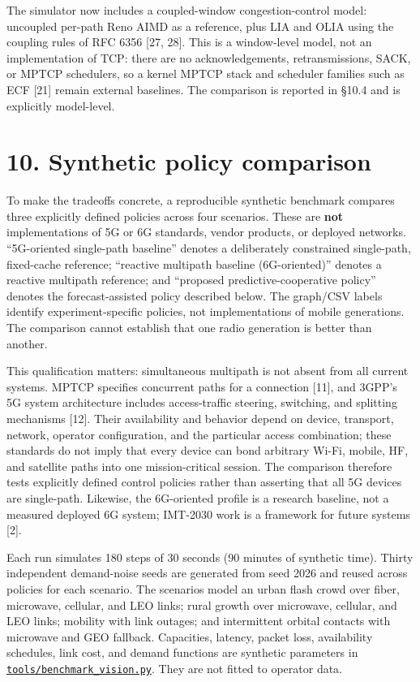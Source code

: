 \documentclass[
  american,
  11pt,
]{article}
\begin{document}
The simulator now includes a coupled-window congestion-control model:
uncoupled per-path Reno AIMD as a reference, plus LIA and OLIA using the
coupling rules of RFC 6356 {[}27, 28{]}. This is a window-level model,
not an implementation of TCP: there are no acknowledgements,
retransmissions, SACK, or MPTCP schedulers, so a kernel MPTCP stack and
scheduler families such as ECF {[}21{]} remain external baselines. The
comparison is reported in §10.4 and is explicitly model-level.

\section{10. Synthetic policy
comparison}\label{synthetic-policy-comparison}

To make the tradeoffs concrete, a reproducible synthetic benchmark
compares three explicitly defined policies across four scenarios. These
are \textbf{not} implementations of 5G or 6G standards, vendor products,
or deployed networks. ``5G-oriented single-path baseline'' denotes a
deliberately constrained single-path, fixed-cache reference; ``reactive
multipath baseline (6G-oriented)'' denotes a reactive multipath
reference; and ``proposed predictive-cooperative policy'' denotes the
forecast-assisted policy described below. The graph/CSV labels identify
experiment-specific policies, not implementations of mobile generations.
The comparison cannot establish that one radio generation is better than
another.

This qualification matters: simultaneous multipath is not absent from
all current systems. MPTCP specifies concurrent paths for a connection
{[}11{]}, and 3GPP's 5G system architecture includes access-traffic
steering, switching, and splitting mechanisms {[}12{]}. Their
availability and behavior depend on device, transport, network, operator
configuration, and the particular access combination; these standards do
not imply that every device can bond arbitrary Wi-Fi, mobile, HF, and
satellite paths into one mission-critical session. The comparison
therefore tests explicitly defined control policies rather than
asserting that all 5G devices are single-path. Likewise, the 6G-oriented
profile is a research baseline, not a measured deployed 6G system;
IMT-2030 work is a framework for future systems {[}2{]}.

Each run simulates 180 steps of 30 seconds (90 minutes of synthetic
time). Thirty independent demand-noise seeds are generated from seed
2026 and reused across policies for each scenario. The scenarios model
an urban flash crowd over fiber, microwave, cellular, and LEO links;
rural growth over microwave, cellular, and LEO links; mobility with link
outages; and intermittent orbital contacts with microwave and GEO
fallback. Capacities, latency, packet loss, availability schedules, link
cost, and demand functions are synthetic parameters in
\href{../tools/benchmark_vision.py}{\texttt{tools/benchmark\_vision.py}}.
They are not fitted to operator data.
\end{document}
